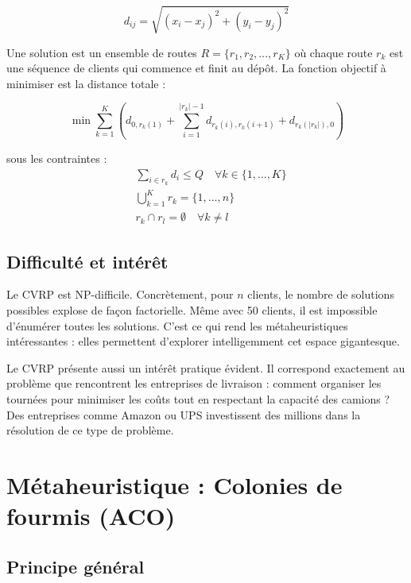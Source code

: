 \documentclass[12pt, a4paper]{article}
\begin{document}
\begin{equation}
    d_{ij} = \sqrt{(x_i - x_j)^2 + (y_i - y_j)^2}
\end{equation}

Une solution est un ensemble de routes $R = \{r_1, r_2, \ldots, r_K\}$ où chaque route $r_k$ est une séquence de clients qui commence et finit au dépôt. La fonction objectif à minimiser est la distance totale :

\begin{equation}
    \min \sum_{k=1}^{K} \left( d_{0, r_k(1)} + \sum_{i=1}^{|r_k|-1} d_{r_k(i), r_k(i+1)} + d_{r_k(|r_k|), 0} \right)
\end{equation}

sous les contraintes :
\begin{align}
    &\sum_{i \in r_k} d_i \leq Q \quad \forall k \in \{1, \ldots, K\} \\
    &\bigcup_{k=1}^{K} r_k = \{1, \ldots, n\} \\
    &r_k \cap r_l = \emptyset \quad \forall k \neq l
\end{align}

\subsection{Difficulté et intérêt}

Le CVRP est NP-difficile. Concrètement, pour $n$ clients, le nombre de solutions possibles explose de façon factorielle. Même avec 50 clients, il est impossible d'énumérer toutes les solutions. C'est ce qui rend les métaheuristiques intéressantes : elles permettent d'explorer intelligemment cet espace gigantesque.

Le CVRP présente aussi un intérêt pratique évident. Il correspond exactement au problème que rencontrent les entreprises de livraison : comment organiser les tournées pour minimiser les coûts tout en respectant la capacité des camions ? Des entreprises comme Amazon ou UPS investissent des millions dans la résolution de ce type de problème.

\section{Métaheuristique : Colonies de fourmis (ACO)}

\subsection{Principe général}
\end{document}
